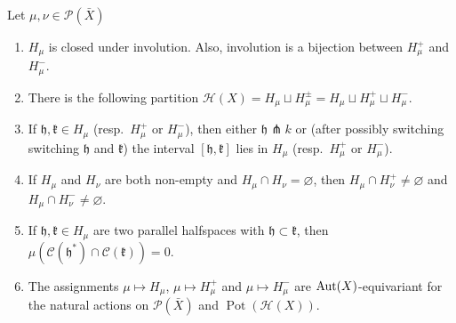\begin{lemma}[{\cite[Lemma\ 4.6]{MR3509968}}]
  \label{lem:4.6}
  Let \(\mu,\nu \in \mathcal{P}(\bar X)\)
  \begin{enumerate}
  \item \(H_\mu\) is closed under involution. Also, involution is a bijection between \(H_\mu^+\) and \(H_\mu^-\).
  \item There is the following partition \(\mathcal{H}(X) = H_\mu \sqcup H_\mu^\pm = H_\mu \sqcup H_\mu^+ \sqcup H_\mu^-\).
  \item If \(\mathfrak{h, k} \in H_\mu\) (resp.\ \(H_\mu^+\) or \(H_\mu^-\)), then either \(\mathfrak{h} \pitchfork k\) or (after possibly switching switching \(\mathfrak{h}\) and \(\mathfrak{k}\)) the interval \([\mathfrak{h}, \mathfrak{k}]\) lies in \(H_\mu\) (resp.\ \(H_\mu^+\) or \(H_\mu^-\)).
  \item If \(H_\mu\) and \(H_\nu\) are both non-empty and \(H_\mu \cap H_\nu = \varnothing\), then \(H_\mu \cap H_\nu^+ \neq \varnothing\) and \(H_\mu \cap H_\nu^- \neq \varnothing\).
  \item If \(\mathfrak{h, k}  \in H_\mu\) are two parallel halfspaces with \(\mathfrak{h} \subset \mathfrak{k}\), then \(\mu(\mathcal{C}(\mathfrak{h}^\ast) \cap \mathcal{C}(\mathfrak{k})) = 0\).
  \item The assignments \(\mu \mapsto H_\mu\), \(\mu \mapsto H_\mu^+\) and \(\mu \mapsto H_\mu^-\) are \(\operatorname{Aut}(X)\)-equivariant for the natural actions on \(\mathcal{P}(\bar X)\) and \(\operatorname{Pot}(\mathcal{H}(X))\).
  \end{enumerate}
\end{lemma}


